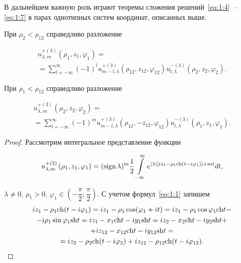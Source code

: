 \begin{russian}
В дальнейшем важную роль играют теоремы сложения решений~\eqref{eq:1:4}~-- \eqref{eq:1:7} в парах однотипных систем координат, описанных выше.

\begin{theorem}
При ${\rho _2} < {\rho _{12}}$ справедливо разложение

\begin{multline}\label{eq:1:8}
u_{\lambda ,m}^{ + (3)}\left( {{\rho _1},{z_1},{\varphi _1}} \right) = \\
= \sum\limits_{l =  - \infty }^\infty  {{{( - 1)}^l}} u_{m - l,\lambda }^{ + (3)}\left( {{\rho _{12}},{z_{12}},{\varphi _{12}}} \right)u_{l,\lambda }^{ - (3)}\left( {{\rho _2},{z_2},{\varphi _2}} \right).
\end{multline}

При ${\rho _1} < {\rho _{12}}$ справедливо разложение

\begin{multline}\label{eq:1:9}
u_{\lambda ,m}^{ + (3)}\left( {{\rho _2},{z_2},{\varphi _2}} \right) = \\
= \sum\limits_{l =  - \infty }^\infty  {{{( - 1)}^m}} u_{m - l,\lambda }^{ + (3)}\left( {{\rho _{12}}, - {z_{12}},{\varphi _{12}}} \right)u_{l,\lambda }^{ - (3)}\left( {{\rho _1},{z_1},{\varphi _1}} \right).
\end{multline}

\end{theorem}

\begin{proof}
Рассмотрим интегральное представление функции~\cite{Nikolaev1998-1}

\begin{equation}\label{eq:1:10}
u_{\lambda ,m}^{ + (3)}\left( {{\rho _1},{z_1},{\varphi _1}} \right) = {({\rm{sign}}{\mkern 1mu} {\kern 1pt} \lambda )^m}\frac{1}{2}\int\limits_{ - \infty }^\infty  {{e^{|\lambda |\left[ {i{z_1} - {\rho _1}{\mathop{\rm ch}\nolimits} (t - i{\varphi _1})} \right] + mt}}} dt,
\end{equation}

$\lambda  \ne 0$, ${\rho _1} > 0$, ${\varphi _1} \in \left( { - \dfrac{\pi }{2};\dfrac{\pi }{2}} \right)$. С учетом формул~\eqref{eq:1:1} запишем
\begin{multline}\label{eq:1:11}
i{z_1} - {\rho _1}{\mathop{\rm ch}\nolimits} (t - i{\varphi _1}) = i{z_1} - {\rho _1}\cos ({\varphi _1} + it) = i{z_1} - {\rho _1}\cos {\varphi _1}{\mathop{\rm ch}\nolimits} t - \\
- i{\rho _1}\sin {\varphi _1}{\mathop{\rm sh}\nolimits} t = i{z_1} - {x_1}{\mathop{\rm ch}\nolimits} t - i{y_1}{\mathop{\rm sh}\nolimits} t = i{z_2} - {x_2}{\mathop{\rm ch}\nolimits} t - i{y_2}{\mathop{\rm sh}\nolimits} t + \\
+ i{z_{12}} - {x_{12}}{\mathop{\rm ch}\nolimits} t - i{y_{12}}{\mathop{\rm sh}\nolimits} t = \\
= i{z_2} - {\rho _2}{\mathop{\rm ch}\nolimits} (t - i{\varphi _2}) + i{z_{12}} - {\rho _{12}}{\mathop{\rm ch}\nolimits} (t - i{\varphi _{12}}).
\end{multline}


\end{proof}
\end{russian}
